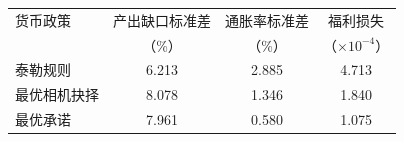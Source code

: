\begin{tabular}{lccc}
\toprule
货币政策 & 产出缺口标准差 & 通胀率标准差 & 福利损失 \\
 & （\%） & （\%） & （$\times10^{-4}$） \\
\midrule
泰勒规则 & 6.213 & 2.885 & 4.713 \\
最优相机抉择 & 8.078 & 1.346 & 1.840 \\
最优承诺 & 7.961 & 0.580 & 1.075 \\
\bottomrule
\end{tabular}
